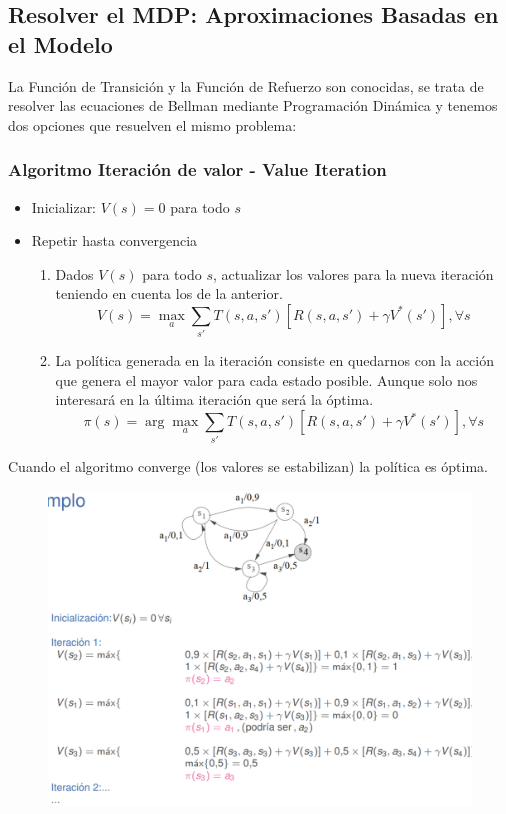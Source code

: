 \documentclass[12pt]{report} %
\begin{document}
\subsection{Resolver el MDP: Aproximaciones Basadas en el Modelo}
La Función de Transición y la Función de Refuerzo son conocidas, se trata de resolver las ecuaciones de Bellman mediante Programación Dinámica y tenemos dos opciones que resuelven el mismo problema:
\subsubsection{Algoritmo Iteración de valor - Value Iteration}
\begin{itemize}
  \item Inicializar: $V(s) = 0$ para todo $s$
  \item Repetir hasta convergencia
  \begin{enumerate}
    \item Dados $V(s)$ para todo $s$, actualizar los valores para la nueva iteración teniendo en cuenta los de la anterior.
    $$V(s) = \max _a \sum _{s'} T(s,a, s') [R(s,a,s') + \gamma V^* (s')], \forall s$$
    \item La política generada en la iteración consiste en quedarnos con la acción que genera el mayor valor para cada estado posible. Aunque solo nos interesará en la última iteración que será la óptima.
    $$\pi(s) = \arg \max_a \sum _{s'} T(s,a, s') [R(s,a,s') + \gamma V^* (s')], \forall s$$
  \end{enumerate}
\end{itemize}
Cuando el algoritmo converge (los valores se estabilizan) la política es óptima.
\begin{figure}[H]
  {\includegraphics[scale=.3]{2021-04-16 13_01_42-refuerzo.pdf - Foxit Reader.png}}
\end{figure}
\end{document}
